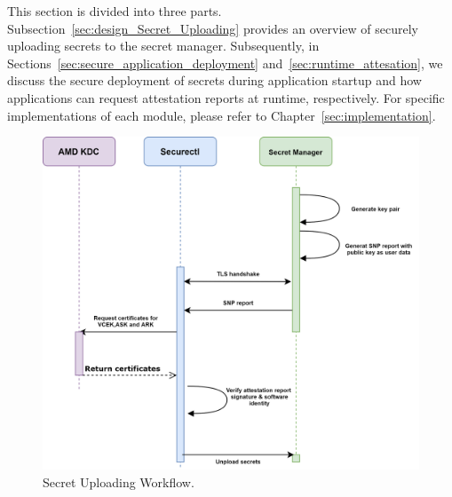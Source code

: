 This section is divided into three parts. Subsection~\ref{sec:design_Secret_Uploading} provides an overview of securely uploading secrets to the secret manager. Subsequently, in Sections~\ref{sec:secure_application_deployment} and~\ref{sec:runtime_attesation}, we discuss the secure deployment of secrets during application startup and how applications can request attestation reports at runtime, respectively. For specific implementations of each module, 
please refer to Chapter~\ref{sec:implementation}.
\begin{figure}[!htb]
    \centering
    \includegraphics[height=0.4\textheight]{images/upload_secret.png}
    \caption[Secret Uploading Workflow]{Secret Uploading Workflow.}
    \label{fig:upload_secret}
\end{figure}

